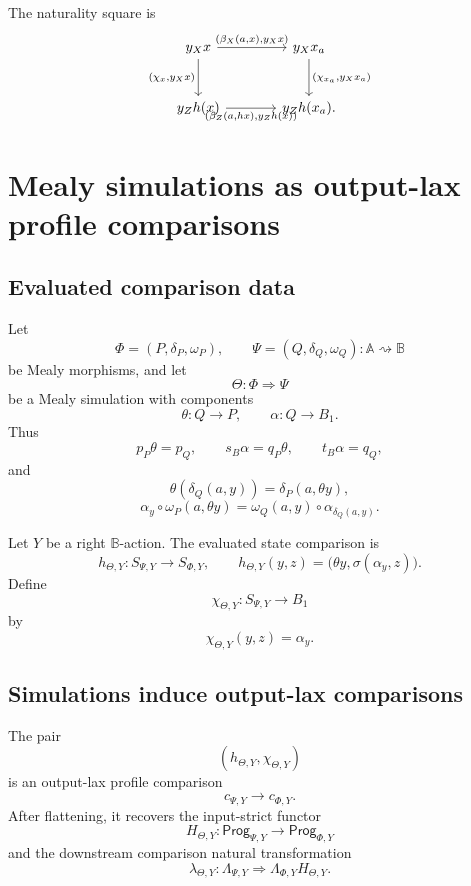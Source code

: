 The naturality square is
\[
\begin{tikzcd}[column sep=large,row sep=large]
y_Xx
  \arrow[r,"{(\beta_X(a,x),y_Xx)}"]
  \arrow[d,"{(\chi_x,y_Xx)}"']
&
y_Xx_a
  \arrow[d,"{(\chi_{x_a},y_Xx_a)}"]
\\
y_Zh(x)
  \arrow[r,"{(\beta_Z(a,hx),y_Zh(x))}"']
&
y_Zh(x_a).
\end{tikzcd}
\]

\section{Mealy simulations as output-lax profile comparisons}
\label{sec:poly-relative-mealy-simulations-profile-comparisons}

\subsection{Evaluated comparison data}
\label{subsec:poly-relative-simulation-evaluated-data}

Let
\[
\Phi=(P,\delta_P,\omega_P),
\qquad
\Psi=(Q,\delta_Q,\omega_Q)
:
\mathbb A\rightsquigarrow\mathbb B
\]
be Mealy morphisms, and let
\[
\Theta:\Phi\Rightarrow\Psi
\]
be a Mealy simulation with components
\[
\theta:Q\to P,
\qquad
\alpha:Q\to B_1.
\]
Thus
\[
p_P\theta=p_Q,
\qquad
s_B\alpha=q_P\theta,
\qquad
t_B\alpha=q_Q,
\]
and
\[
\theta(\delta_Q(a,y))
=
\delta_P(a,\theta y),
\]
\[
\alpha_y\circ\omega_P(a,\theta y)
=
\omega_Q(a,y)\circ\alpha_{\delta_Q(a,y)}.
\]

Let \(Y\) be a right \(\mathbb B\)-action.  The evaluated state comparison is
\[
h_{\Theta,Y}:S_{\Psi,Y}\to S_{\Phi,Y},
\qquad
h_{\Theta,Y}(y,z)
=
\bigl(\theta y,\sigma(\alpha_y,z)\bigr).
\]
Define
\[
\chi_{\Theta,Y}:S_{\Psi,Y}\to B_1
\]
by
\[
\chi_{\Theta,Y}(y,z)=\alpha_y.
\]

\subsection{Simulations induce output-lax comparisons}
\label{subsec:poly-relative-simulation-output-lax-theorem}

\begin{theorem}
\label{thm:poly-relative-simulations-profile-comparisons}
The pair
\[
(h_{\Theta,Y},\chi_{\Theta,Y})
\]
is an output-lax profile comparison
\[
c_{\Psi,Y}\longrightarrow c_{\Phi,Y}.
\]
After flattening, it recovers the input-strict functor
\[
H_{\Theta,Y}:
\mathsf{Prog}_{\Psi,Y}\to\mathsf{Prog}_{\Phi,Y}
\]
and the downstream comparison natural transformation
\[
\lambda_{\Theta,Y}:
\Lambda_{\Psi,Y}
\Rightarrow
\Lambda_{\Phi,Y}H_{\Theta,Y}.
\]
\end{theorem}

